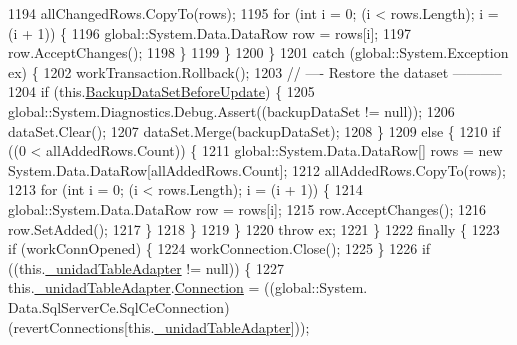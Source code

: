 \begin{DoxyCode}
1194                     allChangedRows.CopyTo(rows);
1195                     \textcolor{keywordflow}{for} (\textcolor{keywordtype}{int} i = 0; (i < rows.Length); i = (i + 1)) \{
1196                         global::System.Data.DataRow row = rows[i];
1197                         row.AcceptChanges();
1198                     \}
1199                 \}
1200             \}
1201             \textcolor{keywordflow}{catch} (global::System.Exception ex) \{
1202                 workTransaction.Rollback();
1203                 \textcolor{comment}{// ---- Restore the dataset -----------}
1204                 \textcolor{keywordflow}{if} (this.\hyperlink{class_proyecto___integrador__3_1_1ds_unidad_table_adapters_1_1_table_adapter_manager_aac31a1655c1548db2583fb7edad0e251}{BackupDataSetBeforeUpdate}) \{
1205                     global::System.Diagnostics.Debug.Assert((backupDataSet != null));
1206                     dataSet.Clear();
1207                     dataSet.Merge(backupDataSet);
1208                 \}
1209                 \textcolor{keywordflow}{else} \{
1210                     \textcolor{keywordflow}{if} ((0 < allAddedRows.Count)) \{
1211                         global::System.Data.DataRow[] rows = \textcolor{keyword}{new} System.Data.DataRow[allAddedRows.Count];
1212                         allAddedRows.CopyTo(rows);
1213                         \textcolor{keywordflow}{for} (\textcolor{keywordtype}{int} i = 0; (i < rows.Length); i = (i + 1)) \{
1214                             global::System.Data.DataRow row = rows[i];
1215                             row.AcceptChanges();
1216                             row.SetAdded();
1217                         \}
1218                     \}
1219                 \}
1220                 \textcolor{keywordflow}{throw} ex;
1221             \}
1222             \textcolor{keywordflow}{finally} \{
1223                 \textcolor{keywordflow}{if} (workConnOpened) \{
1224                     workConnection.Close();
1225                 \}
1226                 \textcolor{keywordflow}{if} ((this.\hyperlink{class_proyecto___integrador__3_1_1ds_unidad_table_adapters_1_1_table_adapter_manager_ad273398026bf55cc8cff4c34547f7564}{\_unidadTableAdapter} != null)) \{
1227                     this.\hyperlink{class_proyecto___integrador__3_1_1ds_unidad_table_adapters_1_1_table_adapter_manager_ad273398026bf55cc8cff4c34547f7564}{\_unidadTableAdapter}.\hyperlink{class_proyecto___integrador__3_1_1ds_unidad_table_adapters_1_1_unidad_table_adapter_a13a9c13fd0ce4e17d7f35891158864db}{Connection} = ((global::System.
      Data.SqlServerCe.SqlCeConnection)(revertConnections[this.\hyperlink{class_proyecto___integrador__3_1_1ds_unidad_table_adapters_1_1_table_adapter_manager_ad273398026bf55cc8cff4c34547f7564}{\_unidadTableAdapter}]));

\end{DoxyCode}
